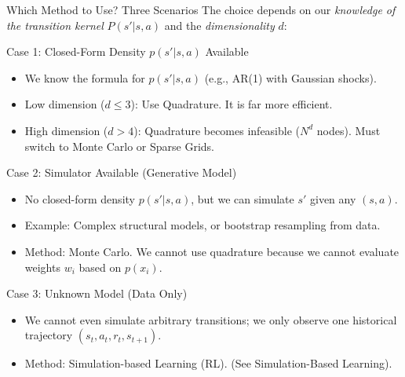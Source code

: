\documentclass[aspectratio=169]{beamer}
\newcommand{\1}{\mathbf{1}}
\begin{document}
\begin{frame}{Which Method to Use? Three Scenarios}
\small
The choice depends on our \textit{knowledge of the transition kernel} $P(s'|s,a)$ and the \textit{dimensionality} $d$:

\vspace{2mm}
Case 1: Closed-Form Density $p(s'|s,a)$ Available
\begin{itemize}\setlength{\itemsep}{1mm}
    \item We know the formula for $p(s'|s,a)$ (e.g., AR(1) with Gaussian shocks).
    \item Low dimension ($d \le 3$): Use Quadrature. It is far more efficient.
    \item High dimension ($d > 4$): Quadrature becomes infeasible ($N^d$ nodes). Must switch to Monte Carlo or Sparse Grids.
\end{itemize}

\vspace{2mm}
Case 2: Simulator Available (Generative Model)
\begin{itemize}\setlength{\itemsep}{1mm}
    \item No closed-form density $p(s'|s,a)$, but we can simulate $s'$ given any $(s,a)$.
    \item Example: Complex structural models, or bootstrap resampling from data.
    \item Method: Monte Carlo. We cannot use quadrature because we cannot evaluate weights $w_i$ based on $p(x_i)$.
\end{itemize}

\vspace{2mm}
Case 3: Unknown Model (Data Only)
\begin{itemize}\setlength{\itemsep}{1mm}
    \item We cannot even simulate arbitrary transitions; we only observe one historical trajectory $(s_t, a_t, r_t, s_{t+1})$.
    \item Method: Simulation-based Learning (RL). (See Simulation-Based Learning).
\end{itemize}
\end{frame}
\end{document}

